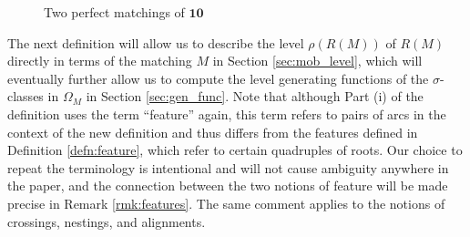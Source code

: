 \documentclass[11pt]{amsart}
\theoremstyle{plain}
\theoremstyle{definition}
\theoremstyle{remark}
\numberwithin{equation}{section}
\newcommand{\ten}{\mathbf{10}}
\newcommand{\mob}{\Omega_M}
\begin{document}
\begin{figure}[h!]
  \centering
\quad
{}
\caption{Two perfect matchings of $\ten$}
\label{fig:matchings}
\end{figure}

The next definition will allow us to describe the level $\rho(R(M))$ of $R(M)$
directly in terms of the matching $M$ in Section \ref{sec:mob_level}, which will
eventually further allow us to compute the level generating functions of the
$\sigma$-classes in $\mob$ in Section \ref{sec:gen_func}. Note that although
Part (i) of the definition uses the term ``feature'' again, this term refers to
pairs of arcs in the context of the new definition and thus differs from the
features defined in Definition \ref{defn:feature}, which refer to certain
quadruples of roots. Our choice to repeat the terminology is intentional and
will not cause ambiguity anywhere in the paper, and the connection between the
two notions of feature will be made precise in Remark \ref{rmk:features}. The
same comment applies to the notions of crossings, nestings, and alignments.
\end{document}
